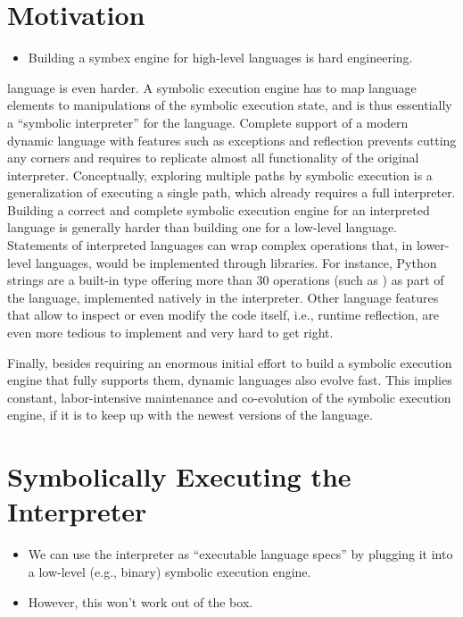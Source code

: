 \section{Motivation}
\label{sec:supportingintlangs}

\begin{itemize}
  \item Building a symbex engine for high-level languages is hard engineering.
\end{itemize}

language is even harder.  A symbolic execution engine has to map language elements to manipulations of the symbolic execution state, and is thus essentially a ``symbolic interpreter'' for the language.  Complete support of a modern dynamic language with features such as exceptions and reflection prevents cutting any corners and requires to replicate almost all functionality of the original interpreter. Conceptually, exploring multiple paths by symbolic execution is a generalization of executing a single path, which already requires a full interpreter.
%
Building a correct and complete symbolic execution engine for an interpreted language is generally harder than building one for a low-level language. 
%
Statements of interpreted languages can wrap complex operations that, in lower-level languages, would be implemented through libraries. For instance, Python strings are a built-in type offering more than 30 operations (such as ) as part of the language, implemented natively in the interpreter. 
%
Other language features that allow to inspect or even modify the code itself, i.e., runtime reflection, are even more tedious to implement and very hard to get right.

Finally, besides requiring an enormous initial effort to build a symbolic execution engine that fully supports them, dynamic languages also evolve fast. This implies constant, labor-intensive maintenance and co-evolution of the symbolic execution engine, if it is to keep up with the newest versions of the language.


\section{Symbolically Executing the Interpreter}

\begin{itemize}
\item We can use the interpreter as ``executable language specs'' by plugging it into a low-level (e.g., binary) symbolic execution engine.
\item However, this won't work out of the box.
\end{itemize}

